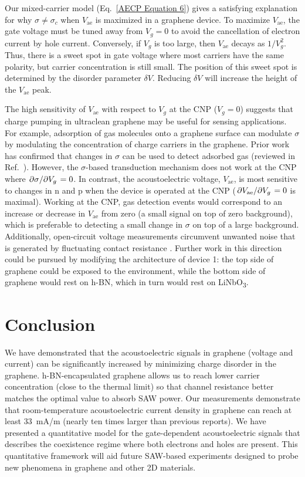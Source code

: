 \documentclass{beavtex_dub_edit}
\begin{document}
Our mixed-carrier model (Eq.\ \ref{AECP Equation 6}) gives a satisfying explanation for why $\sigma \neq \sigma_c$ when $V_{\mathrm{ae}}$ is maximized in a graphene device. To maximize $V_{\mathrm{ae}}$, the gate voltage must be tuned away from $V_g = 0$ to avoid the cancellation of electron current by hole current. Conversely, if $V_g$ is too large, then $V_{\mathrm{ae}}$ decays as $1/V_g^2$. Thus, there is a sweet spot in gate voltage where most carriers have the same polarity, but carrier concentration is still small. The position of this sweet spot is determined by the disorder parameter $\delta V$. Reducing $\delta V$ will increase the height of the $V_{\mathrm{ae}}$ peak. 

The high sensitivity of $V_{\mathrm{ae}}$ with respect to $V_g$ at the CNP ($V_g = 0$) suggests that charge pumping in ultraclean graphene may be useful for sensing applications. For example, adsorption of gas molecules onto a graphene surface can modulate $\sigma$ by modulating the concentration of charge carriers in the graphene. Prior work has confirmed that changes in $\sigma$ can be used to detect adsorbed gas (reviewed in Ref.\ \cite{yang_gas_2017}). However, the $\sigma$-based transduction mechanism does not work at the CNP where $\pdv*{\sigma}{V_g} = 0$. In contrast, the acoustoelectric voltage, $V_{\mathrm{ae}}$, is most sensitive to changes in n and p when the device is operated at the CNP ($\pdv*{V_{\mathrm{ae}}}{V_g} = 0$ is maximal). Working at the CNP, gas detection events would correspond to an increase or decrease in $V_{\mathrm{ae}}$ from zero (a small signal on top of zero background), which is preferable to detecting a small change in $\sigma$ on top of a large background. Additionally, open-circuit voltage measurements circumvent unwanted noise that is generated by fluctuating contact resistance \cite{schaefer_improved_2020}. Further work in this direction could be pursued by modifying the architecture of device 1: the top side of graphene could be exposed to the environment, while the bottom side of graphene would rest on h-BN, which in turn would rest on LiNbO\textsubscript{3}.


\section{Conclusion}
We have demonstrated that the acoustoelectric signals in graphene (voltage and current) can be significantly increased by minimizing charge disorder in the graphene. h-BN-encapsulated graphene allows us to reach lower carrier concentration (close to the thermal limit) so that channel resistance better matches the optimal value to absorb SAW power. Our measurements demonstrate that room-temperature acoustoelectric current density in graphene can reach at least \SI{33}{\milli\ampere/\meter} (nearly ten times larger than previous reports). We have presented a quantitative model for the gate-dependent acoustoelectric signals that describes the coexistence regime where both electrons and holes are present. This quantitative framework will aid future SAW-based experiments designed to probe new phenomena in graphene and other 2D materials.
\end{document}
